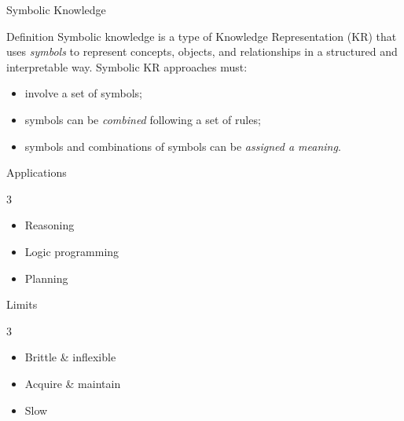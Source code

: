 \documentclass[presentation]{beamer}\mode<presentation>{\usetheme{AMSBolognaFC}}
\begin{document}
\begin{frame}[c]{Symbolic Knowledge~}
    \begin{exampleblock}{Definition}
        Symbolic knowledge is a type of Knowledge Representation (KR) that uses \emph{symbols} to represent concepts, objects, and relationships in a structured and interpretable way.
        Symbolic KR approaches must:
        \begin{itemize}
            \item involve a set of symbols;
            \item symbols can be \emph{combined} following a set of rules;
            \item symbols and combinations of symbols can be \emph{assigned a meaning}.
        \end{itemize}
    \end{exampleblock}

    \begin{alertblock}{Applications}
        \begin{multicols}{3}
            {\small
                \begin{itemize}
                    \item Reasoning
                    \item Logic programming
                    \item Planning
                \end{itemize}
            }
        \end{multicols}
    \end{alertblock}

    \begin{block}{Limits}
        \begin{multicols}{3}
            {\small
                \begin{itemize}
                    \item Brittle \& inflexible
                    \item Acquire \& maintain
                    \item Slow
                \end{itemize}
            }
        \end{multicols}
    \end{block}

\end{frame}
\end{document}

